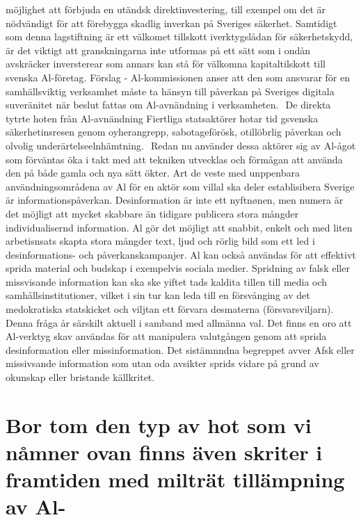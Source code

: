 {{{{{{{{möjlighet att förbjuda en utändsk direktinvestering, till exempel om det är nödvändigt för att förebygga skadlig inverkan på Sveriges säkerhet. Samtidigt som denna lagstiftning är ett välkomet tillskott iverktygslådan för säkerhetskydd, är det viktigt att granskningarna inte utformas på ett sätt som i ondån avskräcker inversterear som annars kan stå för välkomna kapitaltilskott till svenska Al-företag.
Förslag
- Al-kommissionen anser att den som ansvarar för en samhällsviktig verksamhet måste ta hänsyn till påverkan på Sveriges digitala suveränitet när beslut fattas om Al-avnändning i verksamheten. \({ }^{}\)
De direkta tytrte hoten från Al-avnändning Fiertliga statsaktörer hotar tid gsvenska säkerhetinsresen genom oyherangrepp, sabotageförösk, otillöbrlig påverkan och olvolig underärtelseelnhämtning. \({ }^{}\) Redan nu använder dessa aktörer sig av Al-ågot som förväntas öka i takt med att tekniken utvecklas och förmågan att använda den på både gamla och nya sätt ökter. Art de veste med unppenbara användningsområdena av Al för en aktör som villal ska deler establisibera Sverige är informationspåverkan. Desinformation är inte ett nyftnønen, men numera är det möjligt att mycket skabbare än tidigare publicera stora mångder individualisernd information.
Al gör det möjligt att snabbit, enkelt och med liten arbetisnsats skapta stora mångder text, ljud och rörlig bild som ett led i desinformations- och påverkanskampanjer. Al kan också användas för att effektivt sprida material och budskap i exempelvis sociala medier. Spridning av falsk eller missvisande information kan ska ske yiftet tads kaldita tillen till media och samhållsinstitutioner, vilket i sin tur kan leda till en försvånging av det medokratiska statskicket och viljtan ett förvara desmaterna (försvarsviljarn). \({ }^{}\) Denna fråga år särskilt aktuell i samband med allmänna val. Det finns en oro att Al-verktyg skav användas för att manipulera valutgången genom att sprida desinformation eller missinformation. Det sistämnndna begreppet avver Afsk eller missivsande information som utan oda avsikter sprids vidare på grund av okunskap eller bristande källkritet.
\section*{Bor tom den typ av hot som vi nåmner ovan finns även skriter i framtiden med milträt tillämpning av Al-}

}}}}}}}}
